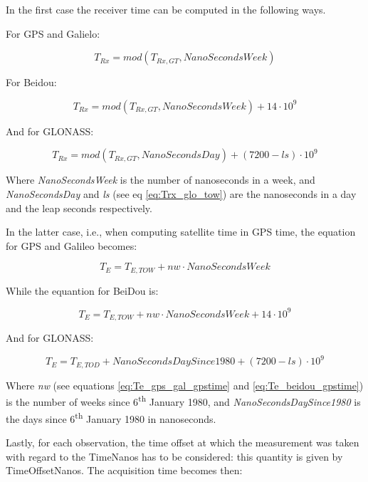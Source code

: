 In the first case the receiver time can be computed in the following ways.

For GPS and Galielo:

\begin{equation}
	T_{Rx} = mod(T_{Rx,GT},NanoSecondsWeek)
	\label{eq:Trx_gps_gal_tow}
\end{equation}

For Beidou:

\begin{equation}
	T_{Rx} = mod(T_{Rx,GT},NanoSecondsWeek) + 14\cdot10^{9}
	\label{eq:Trx_beid_tow}
\end{equation}

And for GLONASS:

\begin{equation}
	T_{Rx} = mod(T_{Rx,GT},NanoSecondsDay) + (7200-ls)\cdot10^{9}
	\label{eq:Trx_glo_tow}
\end{equation}

Where \textit{NanoSecondsWeek} is the number of nanoseconds in a week, and \textit{NanoSecondsDay} and \textit{ls} (see eq \ref{eq:Trx_glo_tow}) are the nanoseconds in a day and the leap seconds respectively.

In the latter case, i.e., when computing satellite time in GPS time, the equation for GPS and Galileo becomes:

\begin{equation}
	T_{E} = T_{E,TOW} + nw\cdot NanoSecondsWeek
	\label{eq:Te_gps_gal_gpstime}
\end{equation}

While the equantion for BeiDou is:

\begin{equation}
	T_{E} =  T_{E,TOW} + nw\cdot NanoSecondsWeek +  14\cdot10^{9}
	\label{eq:Te_beidou_gpstime}
\end{equation}

And for GLONASS:

\begin{equation}
	T_{E} =  T_{E,TOD} + NanoSecondsDaySince1980 +  (7200-ls)\cdot10^{9} 
	\label{eq:Te_glo_gpstime}
\end{equation}

Where \textit{nw} (see equations \ref{eq:Te_gps_gal_gpstime} and \ref{eq:Te_beidou_gpstime}) is the number of weeks since 6\textsuperscript{th} January 1980, and \textit{NanoSecondsDaySince1980} is the days since 6\textsuperscript{th} January 1980 in nanoseconds.

Lastly, for each observation, the time offset at which the measurement was taken with regard to the TimeNanos has to be considered: this quantity is given by TimeOffsetNanos. The acquisition time  becomes then:

